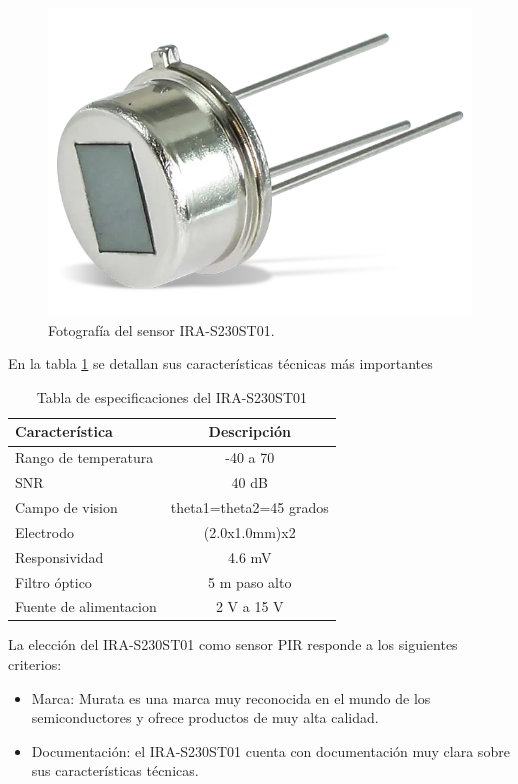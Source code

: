\begin{figure}[h]
	\centering
	\includegraphics[scale=0.2]{./Figures/pir_photo.png}
	\caption{Fotografía del sensor IRA-S230ST01\protect\footnotemark.}
	\label{fig:pir_photo}
\end{figure}

En la tabla \ref{tab:pir_specs} se detallan sus características técnicas más importantes

\begin{table}[h]
	\centering
	\caption[IRA-S230ST01 especificaciones]{Tabla de especificaciones del IRA-S230ST01 \cite{pir_info}}
	\begin{tabular}{lc}   
		\toprule
		\textbf{Característica} 	 & \textbf{Descripción}  \\
		\midrule
		Rango de temperatura & -40 \textcelsius  a 70 \textcelsius\\
		SNR & 40 dB \\
		Campo de vision & theta1=theta2=45 grados \\
		Electrodo & (2.0x1.0mm)x2 \\
		Responsividad & 4.6 mV \\
		Filtro óptico & 5 \textmu m paso alto \\
		Fuente de alimentacion & 2 V a 15 V \\
		\bottomrule
		\hline
	\end{tabular}
	\label{tab:pir_specs}
\end{table}

La elección del IRA-S230ST01 como sensor PIR responde a los siguientes criterios: \\
\begin{itemize}
	\item Marca: Murata es una marca muy reconocida en el mundo de los semiconductores y ofrece productos de muy alta calidad.
	\item Documentación: el IRA-S230ST01 cuenta con documentación muy clara sobre sus características técnicas.
\end{itemize}

